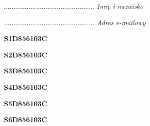 \begin{turn}{90}\begin{minipage}{\linewidth} \vspace{20mm} ................................................  \textit{Imię i nazwisko}\end{minipage}\end{turn}

\begin{turn}{90}\begin{minipage}{\linewidth} \vspace{20mm} ................................................  \textit{Adres e-mailowy}\end{minipage}\end{turn}

\begin{turn}{90}\huge \begin{minipage}{\linewidth} \vspace{10mm}\textbf{S1D856103C}\end{minipage}\end{turn}

\begin{turn}{90}\huge \begin{minipage}{\linewidth} \vspace{10mm}\textbf{S2D856103C}\end{minipage}\end{turn}

\begin{turn}{90}\huge \begin{minipage}{\linewidth} \vspace{10mm}\textbf{S3D856103C}\end{minipage}\end{turn}

\begin{turn}{90}\huge \begin{minipage}{\linewidth} \vspace{10mm}\textbf{S4D856103C}\end{minipage}\end{turn}

\begin{turn}{90}\huge \begin{minipage}{\linewidth} \vspace{10mm}\textbf{S5D856103C}\end{minipage}\end{turn}

\begin{turn}{90}\huge \begin{minipage}{\linewidth} \vspace{10mm}\textbf{S6D856103C}\end{minipage}\end{turn}

